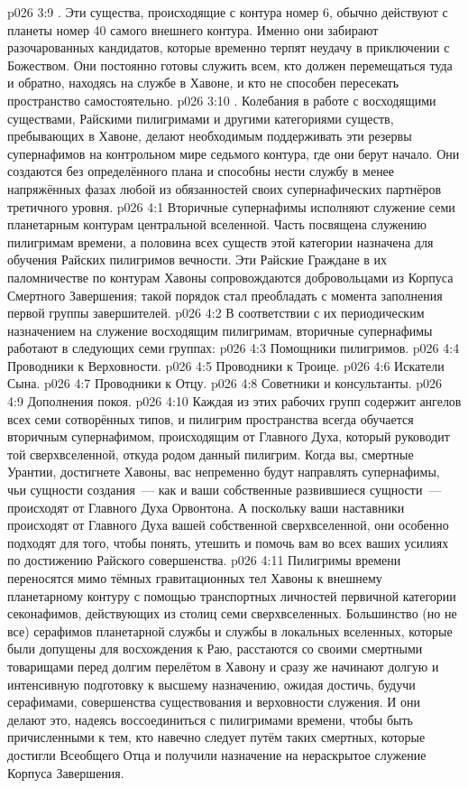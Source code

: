 \vs p026 3:9 . Эти существа, происходящие с контура номер 6, обычно действуют с планеты номер 40 самого внешнего контура. Именно они забирают разочарованных кандидатов, которые временно терпят неудачу в приключении с Божеством. Они постоянно готовы служить всем, кто должен перемещаться туда и обратно, находясь на службе в Хавоне, и кто не способен пересекать пространство самостоятельно.
\vs p026 3:10 . Колебания в работе с восходящими существами, Райскими пилигримами и другими категориями существ, пребывающих в Хавоне, делают необходимым поддерживать эти резервы супернафимов на контрольном мире седьмого контура, где они берут начало. Они создаются без определённого плана и способны нести службу в менее напряжённых фазах любой из обязанностей своих супернафических партнёров третичного уровня.
\vs p026 4:1 Вторичные супернафимы исполняют служение семи планетарным контурам центральной вселенной. Часть посвящена служению пилигримам времени, а половина всех существ этой категории назначена для обучения Райских пилигримов вечности. Эти Райские Граждане в их паломничестве по контурам Хавоны сопровождаются добровольцами из Корпуса Смертного Завершения; такой порядок стал преобладать с момента заполнения первой группы завершителей.
\vs p026 4:2 \pc В соответствии с их периодическим назначением на служение восходящим пилигримам, вторичные супернафимы работают в следующих семи группах:
\vs p026 4:3 Помощники пилигримов.
\vs p026 4:4 Проводники к Верховности.
\vs p026 4:5 Проводники к Троице.
\vs p026 4:6 Искатели Сына.
\vs p026 4:7 Проводники к Отцу.
\vs p026 4:8 Советники и консультанты.
\vs p026 4:9 Дополнения покоя.
\vs p026 4:10 \pc Каждая из этих рабочих групп содержит ангелов всех семи сотворённых типов, и пилигрим пространства всегда обучается вторичным супернафимом, происходящим от Главного Духа, который руководит той сверхвселенной, откуда родом данный пилигрим. Когда вы, смертные Урантии, достигнете Хавоны, вас непременно будут направлять супернафимы, чьи сущности создания~--- как и ваши собственные развившиеся сущности~--- происходят от Главного Духа Орвонтона. А поскольку ваши наставники происходят от Главного Духа вашей собственной сверхвселенной, они особенно подходят для того, чтобы понять, утешить и помочь вам во всех ваших усилиях по достижению Райского совершенства.
\vs p026 4:11 Пилигримы времени переносятся мимо тёмных гравитационных тел Хавоны к внешнему планетарному контуру с помощью транспортных личностей первичной категории секонафимов, действующих из столиц семи сверхвселенных. Большинство (но не все) серафимов планетарной службы и службы в локальных вселенных, которые были допущены для восхождения к Раю, расстаются со своими смертными товарищами перед долгим перелётом в Хавону и сразу же начинают долгую и интенсивную подготовку к высшему назначению, ожидая достичь, будучи серафимами, совершенства существования и верховности служения. И они делают это, надеясь воссоединиться с пилигримами времени, чтобы быть причисленными к тем, кто навечно следует путём таких смертных, которые достигли Всеобщего Отца и получили назначение на нераскрытое служение Корпуса Завершения.
